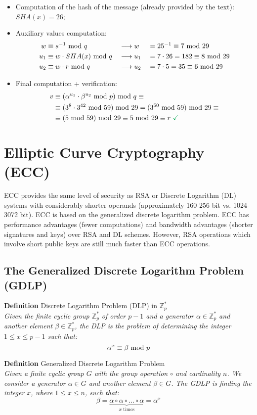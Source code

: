 \begin{itemize}
    \item Computation of the hash of the message (already provided by the text): $SHA(x)=26$;
    \item Auxiliary values computation:
    \begin{alignat*}{3}
        w&\equiv s^{-1}\text{ mod } q&&\longrightarrow w&&=25^{-1}\equiv7\text{ mod }29\\
        u_1&\equiv w\cdot SHA(x)\text{ mod } q&&\longrightarrow u_1&&=7\cdot26=182\equiv8\text{ mod }29\\
        u_2&\equiv w\cdot r\text{ mod } q&&\longrightarrow u_2&&=7\cdot5=35\equiv6\text{ mod }29
    \end{alignat*}
    \item Final computation + verification:
    \begin{align*}
        v&\equiv(\alpha^{u_1}\cdot\beta^{u_2}\mymod p)\mymod q\equiv\\
        &\equiv(3^8\cdot3^{42}\mymod 59)\mymod29=(3^{50}\mymod59)\mymod29\equiv\\
        &\equiv (5\mymod59)\mymod29\equiv5\mymod29\equiv r\text{ \textcolor{Green}\checkmark}
    \end{align*}
\end{itemize}

\newpage
\section{Elliptic Curve Cryptography (ECC)}
ECC provides the same level of security as RSA or Discrete Logarithm (DL) systems with considerably shorter operands (approximately 160-256 bit vs. 1024-3072 bit). ECC is based on the generalized discrete logarithm problem. ECC has performance advantages (fewer computations) and bandwidth advantages (shorter signatures and keys) over RSA and DL schemes. However, RSA operations which involve short public keys are still much faster than ECC operations.

\subsection{The Generalized Discrete Logarithm Problem (GDLP)}
\begin{framed}
    \hfill\break\textbf{Definition} Discrete Logarithm Problem (DLP) in $\mathbb{Z}_p^*$\\
    \textit{Given the finite cyclic group $\mathbb{Z}_p^*$ of order $p-1$ and a generator $\alpha\in\mathbb{Z}_p^*$ and another element $\beta\in\mathbb{Z}_p^*$, the DLP is the problem of determining the integer $1\le x\le p-1$ such that:}
    $$\alpha^x\equiv \beta\text{ mod } p$$
\end{framed}
\begin{framed}
    \hfill\break\textbf{Definition} Generalized Discrete Logarithm Problem\\
    \textit{Given a finite cyclic group $G$ with the group operation $\circ$ and cardinality $n$. We consider a generator $\alpha\in G$ and another element $\beta\in G$. The GDLP is finding the integer $x$, where $1\le x\le n$, such that:}
    $$\beta=\underbrace{\alpha\circ\alpha\circ...\circ\alpha}_{x\text{ times}}=\alpha^x$$
\end{framed}

